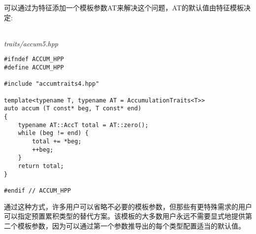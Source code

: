可以通过为特征添加一个模板参数AT来解决这个问题，AT的默认值由特征模板决定:

\hspace*{\fill} \\ %
\noindent
\textit{traits/accum5.hpp}
\begin{lstlisting}[style=styleCXX]
#ifndef ACCUM_HPP
#define ACCUM_HPP

#include "accumtraits4.hpp"

template<typename T, typename AT = AccumulationTraits<T>>
auto accum (T const* beg, T const* end)
{
	typename AT::AccT total = AT::zero();
	while (beg != end) {
		total += *beg;
		++beg;
	}
	return total;
}

#endif // ACCUM_HPP
\end{lstlisting}

通过这种方式，许多用户可以省略不必要的模板参数，但那些有更特殊需求的用户可以指定预置累积类型的替代方案。该模板的大多数用户永远不需要显式地提供第二个模板参数，因为可以通过第一个参数推导出的每个类型配置适当的默认值。









